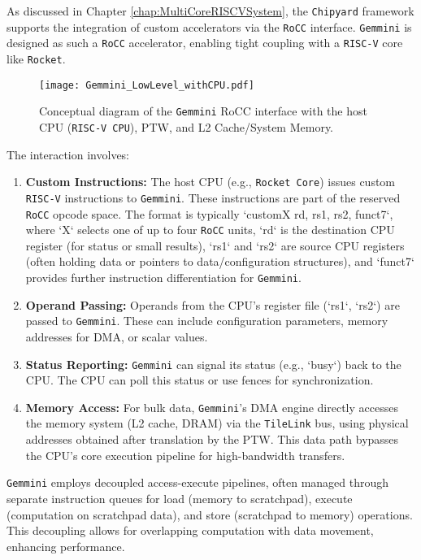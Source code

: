 As discussed in Chapter \ref{chap:MultiCoreRISCVSystem}, the \texttt{Chipyard} framework supports the integration of custom accelerators via the \texttt{RoCC} interface. \texttt{Gemmini} is designed as such a \texttt{RoCC} accelerator, enabling tight coupling with a \texttt{RISC-V} core like \texttt{Rocket}.

\begin{figure}[h!]
    \centering
    \texttt{[image: Gemmini\_LowLevel\_withCPU.pdf]}
    \caption{Conceptual diagram of the \texttt{Gemmini} RoCC interface with the host CPU (\texttt{RISC-V CPU}), PTW, and L2 Cache/System Memory.}
    \label{fig:gemmini_rocc_interface}
\end{figure}

The interaction involves:
\begin{enumerate}
    \item \textbf{Custom Instructions:} The host CPU (e.g., \texttt{Rocket Core}) issues custom \texttt{RISC-V} instructions to \texttt{Gemmini}. These instructions are part of the reserved \texttt{RoCC} opcode space. The format is typically `customX rd, rs1, rs2, funct7`, where `X` selects one of up to four \texttt{RoCC} units, `rd` is the destination CPU register (for status or small results), `rs1` and `rs2` are source CPU registers (often holding data or pointers to data/configuration structures), and `funct7` provides further instruction differentiation for \texttt{Gemmini}.
    \item \textbf{Operand Passing:} Operands from the CPU's register file (`rs1`, `rs2`) are passed to \texttt{Gemmini}. These can include configuration parameters, memory addresses for DMA, or scalar values.
    \item \textbf{Status Reporting:} \texttt{Gemmini} can signal its status (e.g., `busy`) back to the CPU. The CPU can poll this status or use fences for synchronization.
    \item \textbf{Memory Access:} For bulk data, \texttt{Gemmini}'s DMA engine directly accesses the memory system (L2 cache, DRAM) via the \texttt{TileLink} bus, using physical addresses obtained after translation by the PTW. This data path bypasses the CPU's core execution pipeline for high-bandwidth transfers.
\end{enumerate}

\texttt{Gemmini} employs decoupled access-execute pipelines, often managed through separate instruction queues for load (memory to scratchpad), execute (computation on scratchpad data), and store (scratchpad to memory) operations. This decoupling allows for overlapping computation with data movement, enhancing performance.

